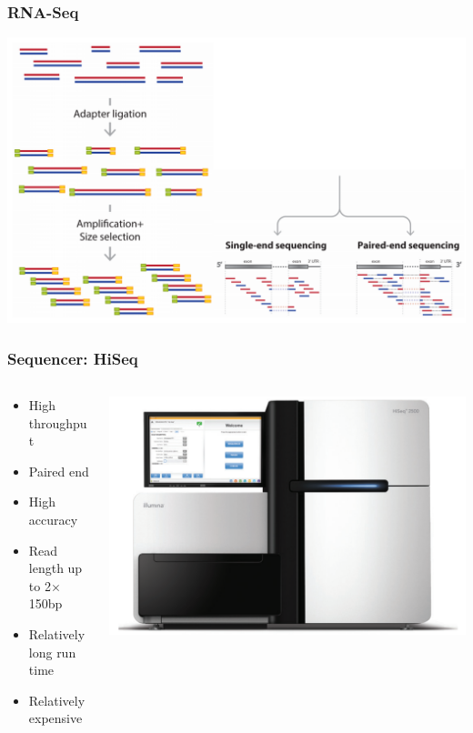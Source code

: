 \documentclass{beamer}			  %
\begin{document}
\begin{frame}
	\frametitle{RNA-Seq}
	\begin{center}
		\includegraphics[height=0.8\textheight]{figures/dge_01bp.png}
	\end{center}
\end{frame}

\begin{frame}
\frametitle{Sequencer: HiSeq}
  \begin{columns}[T]
	\begin{column}{.62\textwidth}
	\begin{itemize}
		\item High throughput
		\item Paired end
		\item High accuracy
		\item Read length up to 2$\times$150bp
		\item Relatively long run time
		\item Relatively expensive
	\end{itemize}
	\end{column}
	\begin{column}{.38\textwidth}
		\includegraphics[width=\textwidth]{figures/dge_02p.png}
	\end{column}
  \end{columns}
\end{frame}
\end{document}
